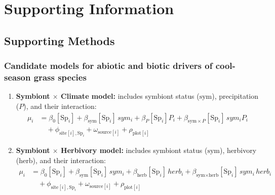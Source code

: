 \documentclass[12pt]{article}\usepackage[]{graphicx}\usepackage[dvipsnames]{xcolor}
\begin{document}
{%
\renewcommand{\theequation}{S\arabic{equation}}

\renewcommand{\figurename}{Fig}
\renewcommand{\thefigure}{S\arabic{figure}}

\renewcommand{\thetable}{S\arabic{table}}
\renewcommand{\tablename}{Table}

\section*{Supporting Information}

\subsection*{Supporting Methods}
\subsubsection*{Candidate models for abiotic and biotic drivers of
cool-season grass species}
\label{sec:models}
\begin{enumerate}
    \item \textbf{Symbiont $\times$ Climate model:} includes symbiont
    status ($\text{sym}$), precipitation ($P$), and their interaction:
    \begin{align*}
    \mu_i &= \beta_0[\text{Sp}_i] + \beta_{\text{sym}}[\text{Sp}_i]\,sym_i
            + \beta_P[\text{Sp}_i] P_i
            + \beta_{\text{sym}\times P}[\text{Sp}_i]\,sym_i P_i \\
    &\quad + \phi_{\text{site}[i],\text{Sp}_i} + \omega_{\text{source}[i]}
            + \rho_{\text{plot}[i]}
    \end{align*}

    \item \textbf{Symbiont $\times$ Herbivory model:} includes symbiont
    status ($\text{sym}$), herbivory ($\text{herb}$), and their
    interaction:
    \begin{align*}
    \mu_i &= \beta_0[\text{Sp}_i] + \beta_{\text{sym}}[\text{Sp}_i]\,sym_i
            + \beta_{\text{herb}}[\text{Sp}_i]\,herb_i
            + \beta_{\text{sym}\times \text{herb}}[\text{Sp}_i]\,sym_i\,herb_i \\
    &\quad + \phi_{\text{site}[i],\text{Sp}_i} + \omega_{\text{source}[i]}
            + \rho_{\text{plot}[i]}
    \end{align*}


\end{enumerate}}
\end{document}
